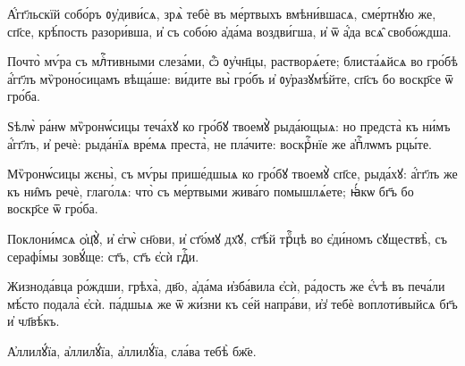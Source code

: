 \label{tropneporoch} 


\hKv А҆́гг҃льскїй собо́ръ ᲂу҆диви́сѧ, зрѧ̀ тебѐ въ ме́ртвыхъ  вмѣни́вшасѧ, сме́ртнꙋю же, сп҃се, крѣ́пость разори́вша, и҆  съ собо́ю а҆да́ма воздви́гша, и҆ ѿ а҆́да всѧ̑ свобо́ждша. 


\hKv Почто̀ мѵ́ра съ млⷭ҇тивными слеза́ми, ѽ ᲂу҆чн҃цы,  растворѧ́ете; блиста́ѧйсѧ во гро́бѣ а҆́гг҃лъ мѷроно́сицамъ  вѣща́ше: ви́дите вы̀  гро́бъ  и҆ ᲂу҆разꙋмѣ́йте, сп҃съ бо воскр҃се ѿ гро́ба. 


\hKv Ѕѣлѡ̀ ра́нѡ мѷронѡ́сицы теча́хꙋ ко гро́бꙋ твоемꙋ̀  рыда́ющыѧ: но предста̀ къ ни́мъ а҆́гг҃лъ, и҆ речѐ: рыда́нїѧ  вре́мѧ преста̀, не пла́чите: воскрⷭ҇нїе же а҆пⷭ҇лѡмъ рцы́те.  


\hKv Мѷронѡ́сицы жєны̀, съ мѵ́ры прише́дшыѧ ко гро́бꙋ твоемꙋ̀  сп҃се, рыда́хꙋ: а҆́гг҃лъ же къ ни̑мъ речѐ, глаго́лѧ: что̀  съ ме́ртвыми жива́го помышлѧ́ете; ꙗ҆́кѡ бг҃ъ бо воскр҃се  ѿ гро́ба.  
%

\hKv Поклони́мсѧ ѻ҆ц҃ꙋ̀, и҆ є҆гѡ̀ сн҃ови, и҆  ст҃о́мꙋ дх҃ꙋ, ст҃ѣ́й трⷪ҇цѣ во є҆ди́номъ сꙋществѣ̀, съ  серафі́мы зовꙋ́ще: ст҃ъ, ст҃ъ є҆сѝ гдⷭ҇и. 
%

\hKv Жизнода́вца ро́ждши, грѣха̀,  дв҃о, а҆да́ма и҆зба́вила є҆сѝ, ра́дость же  є҆́ѵѣ въ печа́ли мѣ́сто подала̀ є҆сѝ.  па́дшыѧ же ѿ жи́зни къ се́й напра́ви, и҆з̾ тебѐ  воплоти́выйсѧ бг҃ъ и҆ чл҃вѣ́къ.  

\hKv А҆ллилꙋ́їа, а҆ллилꙋ́їа, а҆ллилꙋ́їа, сла́ва тебѣ̀ бж҃е.  

